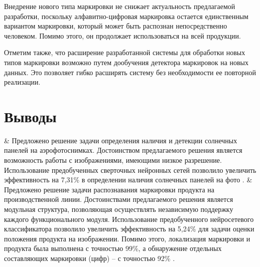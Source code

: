 Внедрение нового типа маркировки не снижает актуальность предлагаемой разработки, поскольку алфавитно-цифровая маркировка остается единственным вариантом маркировки, который может быть распознан непосредственно человеком. Помимо этого, он продолжает использоваться на всей продукции.

Отметим также, что расширение разработанной системы для обработки новых типов маркировки возможно путем дообучения детектора маркировок на новых данных. Это позволяет гибко расширять систему без необходимости ее повторной реализации.

\section{Выводы}

\begin{easylistNum}
    & Предложено решение задачи определения наличия и детекции солнечных панелей на аэрофотоснимках. Достоинством предлагаемого решения является возможность работы с изображениями, имеющими низкое разрешение. Использование предобученных сверточных нейронных сетей позволило увеличить эффективность на 7,31\% в определении наличия солнечных панелей на фото \cite{9-A, 14-A, 15-A}.
	& Предложено решение задачи распознавания маркировки продукта на производственной линии. Достоинствами предлагаемого решения является модульная структура, позволяющая осуществлять независимую поддержку каждого функционального модуля. Использование предобученного нейросетевого классификатора позволило увеличить эффективность на 5,24\% для задачи оценки положения продукта на изображении. Помимо этого, локализация маркировки и продукта была выполнена с точностью 99\%, а обнаружение отдельных составляющих маркировки (цифр) -- с точностью 92\% \cite{7-A, 29-A, 6-A, 25-A, 27-A, 23-A, 24-A, 8-A, 26-A, 28-A}.
\end{easylistNum}
